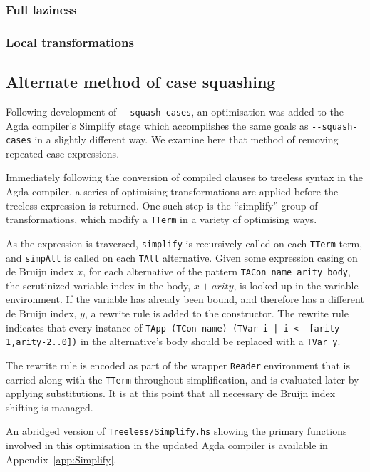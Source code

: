 \subsubsection*{Full laziness}

\subsubsection*{Local transformations}

\subsection{Alternate method of case squashing}

Following development of \texttt{-{}-squash-cases}, an optimisation was added to the Agda compiler's Simplify stage which accomplishes the same goals as \texttt{-{}-squash-cases} in a slightly different way. We examine here that method of removing repeated case expressions.

Immediately following the conversion of compiled clauses to treeless syntax in the Agda compiler, a series of optimising transformations are applied before the treeless expression is returned. %
One such step is the ``simplify'' group of transformations, which modify a \lstinline{TTerm} in a variety of optimising ways.

As the expression is traversed, \lstinline{simplify} is recursively called on each \lstinline{TTerm} term, and \lstinline{simpAlt} is called on each \lstinline{TAlt} alternative. Given some expression casing on de Bruijn index $x$, for each alternative of the pattern \lstinline{TACon name arity body}, the scrutinized variable index in the body, $x + arity$, is looked up in the variable environment. If the variable has already been bound, and therefore has a different de Bruijn index, $y$, a rewrite rule is added to the constructor. The rewrite rule indicates that every instance of \lstinline{TApp (TCon name) (TVar i | i <- [arity-1,arity-2..0])} in the alternative's body should be replaced with a \lstinline{TVar y}.

The rewrite rule is encoded as part of the wrapper \lstinline{Reader} environment that is carried along with the \lstinline{TTerm} throughout simplification, and is evaluated later by applying substitutions. It is at this point that all necessary de Bruijn index shifting is managed.

An abridged version of \texttt{Treeless/Simplify.hs} showing the primary functions involved in this optimisation in the updated Agda compiler is available in Appendix~\ref{app:Simplify}.

